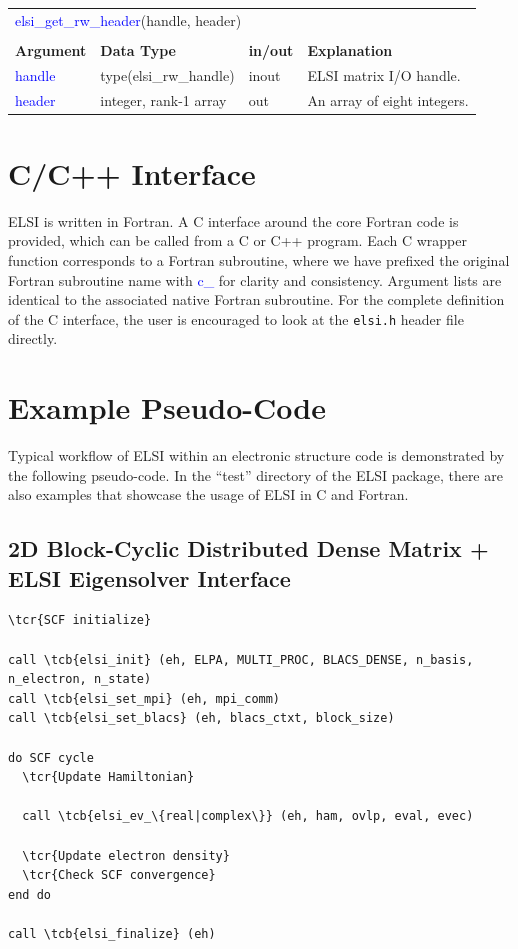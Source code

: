 \documentclass{report}
\newcommand{\tcb}[1]{\textcolor{blue}{#1}}
\newcommand{\tcr}[1]{\textcolor{red}{#1}}
\begin{document}
\begin{tabular}[]{|p{20mm}|p{45mm}|p{15mm}|p{85mm}|}
\multicolumn{4}{l}{\tcb{elsi\_get\_rw\_header}(handle, header)}\\
\multicolumn{4}{l}{}\\
\hline
\multicolumn{1}{|l|}{\textbf{Argument}} & \multicolumn{1}{l|}{\textbf{Data Type}} & \multicolumn{1}{l|}{\textbf{in/out}} & \multicolumn{1}{l|}{\textbf{Explanation}}\\
\hline
\tcb{handle} & type(elsi\_rw\_handle) & inout & ELSI matrix I/O handle.\\
\hline
\tcb{header} & integer, rank-1 array  & out   & An array of eight integers.\\
\hline
\end{tabular}

\section{C/C++ Interface}
\label{sec:c}
ELSI is written in Fortran. A C interface around the core Fortran code is provided, which can be called from a C or C++ program. Each C wrapper function corresponds to a Fortran subroutine, where we have prefixed the original Fortran subroutine name with \tcb{c\_} for clarity and consistency. Argument lists are identical to the associated native Fortran subroutine. For the complete definition of the C interface, the user is encouraged to look at the \texttt{elsi.h} header file directly.

\section{Example Pseudo-Code}
\label{sec:example}
Typical workflow of ELSI within an electronic structure code is demonstrated by the following pseudo-code. In the ``test'' directory of the ELSI package, there are also examples that showcase the usage of ELSI in C and Fortran.

\subsection*{2D Block-Cyclic Distributed Dense Matrix + ELSI Eigensolver Interface}
\begin{tcolorbox}
\begin{Verbatim}[commandchars=\\\{\}]
\tcr{SCF initialize}

call \tcb{elsi_init} (eh, ELPA, MULTI_PROC, BLACS_DENSE, n_basis, n_electron, n_state)
call \tcb{elsi_set_mpi} (eh, mpi_comm)
call \tcb{elsi_set_blacs} (eh, blacs_ctxt, block_size)

do SCF cycle
  \tcr{Update Hamiltonian}

  call \tcb{elsi_ev_\{real|complex\}} (eh, ham, ovlp, eval, evec)

  \tcr{Update electron density}
  \tcr{Check SCF convergence}
end do

call \tcb{elsi_finalize} (eh)
\end{Verbatim}
\end{tcolorbox}
\end{document}
